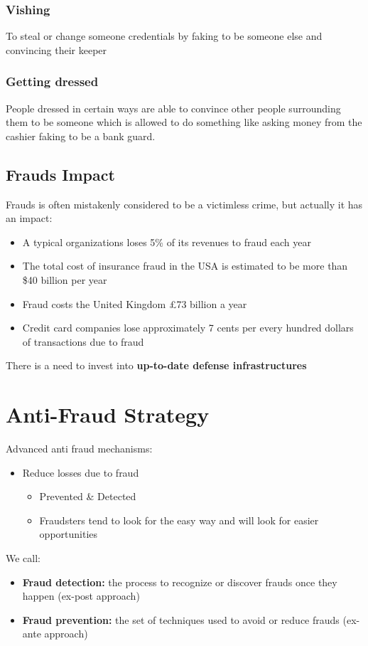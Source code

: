         \subsubsection{Vishing}
            To steal or change someone credentials by faking to be someone else and convincing their keeper
        \subsubsection{Getting dressed}
            People dressed in certain ways are able to convince other people surrounding them to be someone which is allowed to do something like asking money from the cashier faking to be a bank guard.
    \subsection{Frauds Impact}
        Frauds is often mistakenly considered to be a victimless crime, but actually it has an impact:
        \begin{itemize}
            \item A typical organizations loses 5\% of its revenues to fraud each year
            \item The total cost of insurance fraud in the USA is estimated to be more than \$40 billion per year 
            \item Fraud costs the United Kingdom £73 billion a year
            \item Credit card companies lose approximately 7 cents per every hundred dollars of transactions due to fraud
        \end{itemize}
        There is a need to invest into \textbf{up-to-date defense infrastructures}
\section{Anti-Fraud Strategy}
    Advanced anti fraud mechanisms:
    \begin{itemize}
        \item Reduce losses due to fraud
        \begin{itemize}
            \item Prevented \& Detected
            \item Fraudsters tend to look for the easy way and will look for easier opportunities 
        \end{itemize}
    \end{itemize}
    We call:
    \begin{itemize}
        \item \textbf{Fraud detection:} the process to recognize or discover frauds once they happen (ex-post approach)
        \item \textbf{Fraud prevention:} the set of techniques used to avoid or reduce frauds (ex-ante approach)
    \end{itemize}
